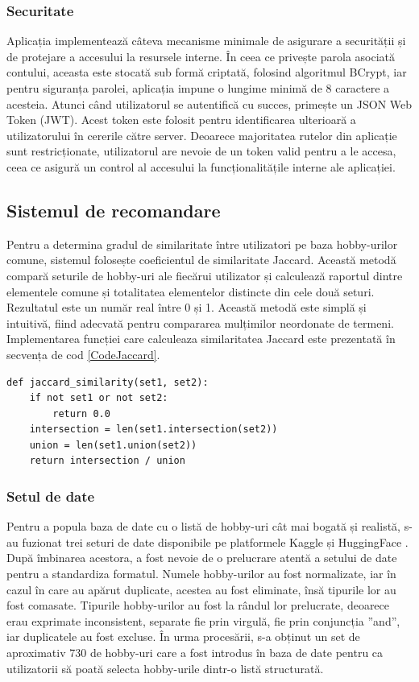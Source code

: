 \subsubsection*{Securitate}
Aplicația implementează câteva mecanisme minimale de asigurare a securității și de protejare a accesului la resursele interne.
În ceea ce privește parola asociată contului, aceasta este stocată sub formă criptată, folosind algoritmul BCrypt, iar pentru siguranța parolei, aplicația impune o lungime minimă de 8 caractere a acesteia.
Atunci când utilizatorul se autentifică cu succes, primește un JSON Web Token (JWT). Acest token este folosit pentru identificarea ulterioară a utilizatorului în cererile către server.
Deoarece majoritatea rutelor din aplicație sunt restricționate, utilizatorul are nevoie de un token valid pentru a le accesa, ceea ce asigură un control al accesului la funcționalitățile interne ale aplicației.

\subsection{Sistemul de recomandare}
\label{subsec:ch4sec1sub3}
Pentru a determina gradul de similaritate între utilizatori pe baza hobby-urilor comune, sistemul folosește coeficientul de similaritate Jaccard.
Această metodă compară seturile de hobby-uri ale fiecărui utilizator și calculează raportul dintre elementele comune și totalitatea elementelor distincte din cele două seturi.
Rezultatul este un număr real între 0 și 1. Această metodă este simplă și intuitivă, fiind adecvată pentru compararea mulțimilor neordonate de termeni.
Implementarea funcției care calculeaza similaritatea Jaccard este prezentată în secvența de cod \ref{CodeJaccard}.

\begin{lstlisting}[caption={Algoritmul de calcul al similarității Jaccard}, label={CodeJaccard}]
def jaccard_similarity(set1, set2):
    if not set1 or not set2:
        return 0.0
    intersection = len(set1.intersection(set2))
    union = len(set1.union(set2))
    return intersection / union
\end{lstlisting}    

\subsubsection*{Setul de date}
Pentru a popula baza de date cu o listă de hobby-uri cât mai bogată și realistă, s-au fuzionat trei seturi de date disponibile pe platformele Kaggle\cite{kaggle_Raj, kaggle_dawid} și HuggingFace \cite{hf_Ugurcan}.
După îmbinarea acestora, a fost nevoie de o prelucrare atentă a setului de date pentru a standardiza formatul.
Numele hobby-urilor au fost normalizate, iar în cazul în care au apărut duplicate, acestea au fost eliminate, însă tipurile lor au fost comasate.
Tipurile hobby-urilor au fost la rândul lor prelucrate, deoarece erau exprimate inconsistent, separate fie prin virgulă, fie prin conjuncția ”and”, iar duplicatele au fost excluse.
În urma procesării, s-a obținut un set de aproximativ 730 de hobby-uri care a fost introdus în baza de date pentru ca utilizatorii să poată selecta hobby-urile dintr-o listă structurată.


